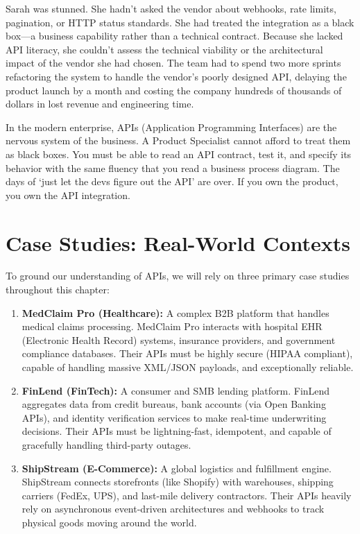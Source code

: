 \documentclass[
  11pt,
  openany,
  oneside]{book}
\providecommand{\tightlist}{%
  \setlength{\itemsep}{0pt}\setlength{\parskip}{0pt}}
\begin{document}
Sarah was stunned. She hadn't asked the vendor about webhooks, rate
limits, pagination, or HTTP status standards. She had treated the
integration as a black box---a business capability rather than a
technical contract. Because she lacked API literacy, she couldn't assess
the technical viability or the architectural impact of the vendor she
had chosen. The team had to spend two more sprints refactoring the
system to handle the vendor's poorly designed API, delaying the product
launch by a month and costing the company hundreds of thousands of
dollars in lost revenue and engineering time.

In the modern enterprise, APIs (Application Programming Interfaces) are
the nervous system of the business. A Product Specialist cannot afford
to treat them as black boxes. You must be able to read an API contract,
test it, and specify its behavior with the same fluency that you read a
business process diagram. The days of `just let the devs figure out the
API' are over. If you own the product, you own the API integration.

\section{Case Studies: Real-World
Contexts}\label{case-studies-real-world-contexts}

To ground our understanding of APIs, we will rely on three primary case
studies throughout this chapter:

\begin{enumerate}
\def\labelenumi{\arabic{enumi}.}
\tightlist
\item
  \textbf{MedClaim Pro (Healthcare):} A complex B2B platform that
  handles medical claims processing. MedClaim Pro interacts with
  hospital EHR (Electronic Health Record) systems, insurance providers,
  and government compliance databases. Their APIs must be highly secure
  (HIPAA compliant), capable of handling massive XML/JSON payloads, and
  exceptionally reliable.
\item
  \textbf{FinLend (FinTech):} A consumer and SMB lending platform.
  FinLend aggregates data from credit bureaus, bank accounts (via Open
  Banking APIs), and identity verification services to make real-time
  underwriting decisions. Their APIs must be lightning-fast, idempotent,
  and capable of gracefully handling third-party outages.
\item
  \textbf{ShipStream (E-Commerce):} A global logistics and fulfillment
  engine. ShipStream connects storefronts (like Shopify) with
  warehouses, shipping carriers (FedEx, UPS), and last-mile delivery
  contractors. Their APIs heavily rely on asynchronous event-driven
  architectures and webhooks to track physical goods moving around the
  world.
\end{enumerate}
\end{document}
